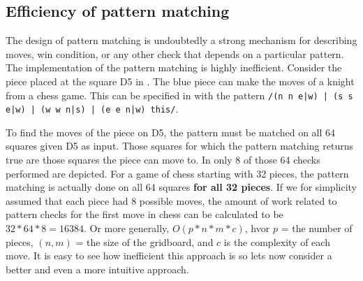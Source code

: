 \subsection{Efficiency of pattern matching}
\label{sec:patternmatchingefficiency}
The design of pattern matching is undoubtedly a strong mechanism for describing moves, win condition, or any other check that depends on a particular pattern. The implementation of the pattern matching is highly inefficient. Consider the piece placed at the square D5 in . The blue piece can make the moves of a knight from a chess game. This can be specified in \productname{} with the pattern \texttt{/(n n e|w) | (s s e|w) | (w w n|s) | (e e n|w) this/}.


To find the moves of the piece on D5, the pattern must be matched on all 64 squares given D5 as input. Those squares for which the pattern matching returns true are those squares the piece can move to. In  only 8 of those 64 checks performed are depicted. For a game of chess starting with 32 pieces, the pattern matching is actually done on all 64 squares \textbf{for all 32 pieces}. If we for simplicity assumed that each piece had 8 possible moves, the amount of work related to pattern checks for the first move in chess can be calculated to be $32 * 64 * 8 = 16384$.
Or more generally, $O(p * n * m * c)$, hvor $p$ = the number of pieces, $(n, m)$ = the size of the gridboard, and $c$ is the complexity of each move. It is easy to see how inefficient this approach is so lets now consider a better and even a more intuitive approach.

